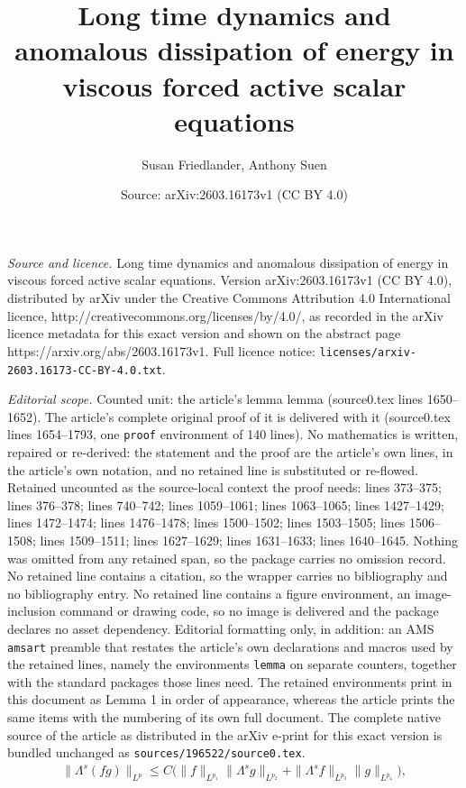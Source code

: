 \documentclass[10pt,a4paper]{amsart}
\title{Long time dynamics and anomalous dissipation of energy in viscous forced active scalar equations}
\author{Susan Friedlander, Anthony Suen}
\date{Source: arXiv:2603.16173v1 (CC BY 4.0)}
\begin{document}
\maketitle

\noindent\emph{Source and licence.} Long time dynamics and anomalous dissipation of energy in viscous forced active scalar equations. Version arXiv:2603.16173v1 (CC BY 4.0), distributed by arXiv under the Creative Commons Attribution 4.0 International licence, http://creativecommons.org/licenses/by/4.0/, as recorded in the arXiv licence metadata for this exact version and shown on the abstract page https://arxiv.org/abs/2603.16173v1. Full licence notice: \texttt{licenses/arxiv-2603.16173-CC-BY-4.0.txt}.\par\smallskip

\noindent\textit{Editorial scope.} Counted unit: the article's lemma lemma (source0.tex lines 1650--1652). The article's complete original proof of it is delivered with it (source0.tex lines 1654--1793, one \texttt{proof} environment of 140 lines). No mathematics is written, repaired or re-derived: the statement and the proof are the article's own lines, in the article's own notation, and no retained line is substituted or re-flowed.  Retained uncounted as the source-local context the proof needs: lines 373--375; lines 376--378; lines 740--742; lines 1059--1061; lines 1063--1065; lines 1427--1429; lines 1472--1474; lines 1476--1478; lines 1500--1502; lines 1503--1505; lines 1506--1508; lines 1509--1511; lines 1627--1629; lines 1631--1633; lines 1640--1645.  Nothing was omitted from any retained span, so the package carries no omission record.  No retained line contains a citation, so the wrapper carries no bibliography and no bibliography entry.  No retained line contains a figure environment, an image-inclusion command or drawing code, so no image is delivered and the package declares no asset dependency.  Editorial formatting only, in addition: an AMS \texttt{amsart} preamble that restates the article's own declarations and macros used by the retained lines, namely the environments \texttt{lemma} on separate counters, together with the standard packages those lines need.  The retained environments print in this document as Lemma 1 in order of appearance, whereas the article prints the same items with the numbering of its own full document.  The complete native source of the article as distributed in the arXiv e-print for this exact version is bundled unchanged as \texttt{sources/196522/source0.tex}.
\begin{align}\label{product estimate}
\|\Lambda^s(fg)\|_{L^p}\le C\Big(\|f\|_{L^{p_1}}\|\Lambda^s g\|_{L^{p_2}}+\|\Lambda^s f\|_{L^{p_3}}\|g\|_{L^{p_4}}\Big),
\end{align}
\end{document}
